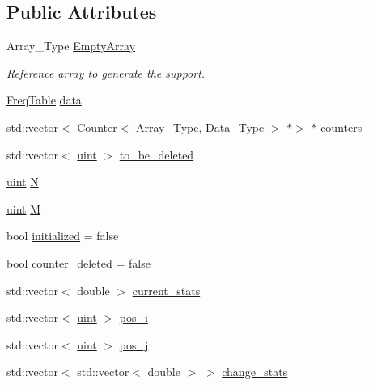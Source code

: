 \subsection*{Public Attributes}
\begin{DoxyCompactItemize}
\item 
Array\+\_\+\+Type \hyperlink{classbarry_1_1_support_ae26e46356041286028ffcc27195b9e8a}{Empty\+Array}
\begin{DoxyCompactList}\small\item\em Reference array to generate the support. \end{DoxyCompactList}\item 
\hyperlink{classbarry_1_1_freq_table}{Freq\+Table} \hyperlink{classbarry_1_1_support_afae160c07727e72f36fcf5a16828ed21}{data}
\item 
std\+::vector$<$ \hyperlink{classbarry_1_1_counter}{Counter}$<$ Array\+\_\+\+Type, Data\+\_\+\+Type $>$ $\ast$$>$ $\ast$ \hyperlink{classbarry_1_1_support_ab7cd458219742709c0a214d7bf70b7d9}{counters}
\item 
std\+::vector$<$ \hyperlink{namespacebarry_a11dfc53ddb4672278319aa04f1e09a6c}{uint} $>$ \hyperlink{classbarry_1_1_support_a026b2c5eecc7404e5715f8a90a594ea1}{to\+\_\+be\+\_\+deleted}
\item 
\hyperlink{namespacebarry_a11dfc53ddb4672278319aa04f1e09a6c}{uint} \hyperlink{classbarry_1_1_support_a1e3158ceae716505cb0c5fb14374be9b}{N}
\item 
\hyperlink{namespacebarry_a11dfc53ddb4672278319aa04f1e09a6c}{uint} \hyperlink{classbarry_1_1_support_aaceb2f83d235c70034e089087991cff8}{M}
\item 
bool \hyperlink{classbarry_1_1_support_a737bc10d6a6e4e3b18aeef0228bd45bb}{initialized} = false
\item 
bool \hyperlink{classbarry_1_1_support_a96c18c68794e756bc84ee2405dca505a}{counter\+\_\+deleted} = false
\item 
std\+::vector$<$ double $>$ \hyperlink{classbarry_1_1_support_a094f0851c7d6bfa7876eb0df2be4439e}{current\+\_\+stats}
\item 
std\+::vector$<$ \hyperlink{namespacebarry_a11dfc53ddb4672278319aa04f1e09a6c}{uint} $>$ \hyperlink{classbarry_1_1_support_ac6012c953dd04c2e74c2105b193f50ac}{pos\+\_\+i}
\item 
std\+::vector$<$ \hyperlink{namespacebarry_a11dfc53ddb4672278319aa04f1e09a6c}{uint} $>$ \hyperlink{classbarry_1_1_support_a5aeba4c4447efe7523abfb1cef864e63}{pos\+\_\+j}
\item 
std\+::vector$<$ std\+::vector$<$ double $>$ $>$ \hyperlink{classbarry_1_1_support_a09cebbb8953514f77e2f70d447d3ff2a}{change\+\_\+stats}
\end{DoxyCompactItemize}


